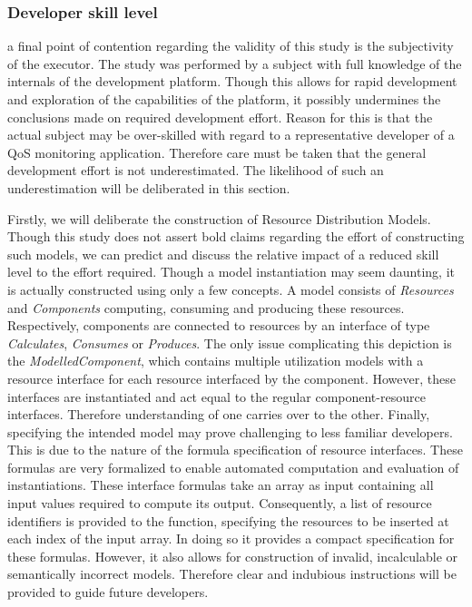 \subsubsection{Developer skill level}
a final point of contention regarding the validity of this study is the subjectivity of the executor. The study was performed by a subject with full knowledge of the internals of the development platform. Though this allows for rapid development and exploration of the capabilities of the platform, it possibly undermines the conclusions made on required development effort. Reason for this is that the actual subject may be over-skilled with regard to a representative developer of a QoS monitoring application. Therefore care must be taken that the general development effort is not underestimated. The likelihood of such an underestimation will be deliberated in this section.

Firstly, we will deliberate the construction of Resource Distribution Models. Though this study does not assert bold claims regarding the effort of constructing such models, we can predict and discuss the relative impact of a reduced skill level to the effort required. Though a model instantiation may seem daunting, it is actually constructed using only a few concepts. A model consists of \emph{Resources} and \emph{Components} computing, consuming and producing these resources. Respectively, components are connected to resources by an interface of type \emph{Calculates}, \emph{Consumes} or \emph{Produces}. The only issue complicating this depiction is the \emph{ModelledComponent}, which contains multiple utilization models with a resource interface for each resource interfaced by the component. However, these interfaces are instantiated and act equal to the regular component-resource interfaces. Therefore understanding of one carries over to the other. Finally, specifying the intended model may prove challenging to less familiar developers. This is due to the nature of the formula specification of resource interfaces. These formulas are very formalized to enable automated computation and evaluation of instantiations. These interface formulas take an array as input containing all input values required to compute its output. Consequently, a list of resource identifiers is provided to the function, specifying the resources to be inserted at each index of the input array. In doing so it provides a compact specification for these formulas. However, it also allows for construction of invalid, incalculable or semantically incorrect models. Therefore clear and indubious instructions will be provided to guide future developers.

